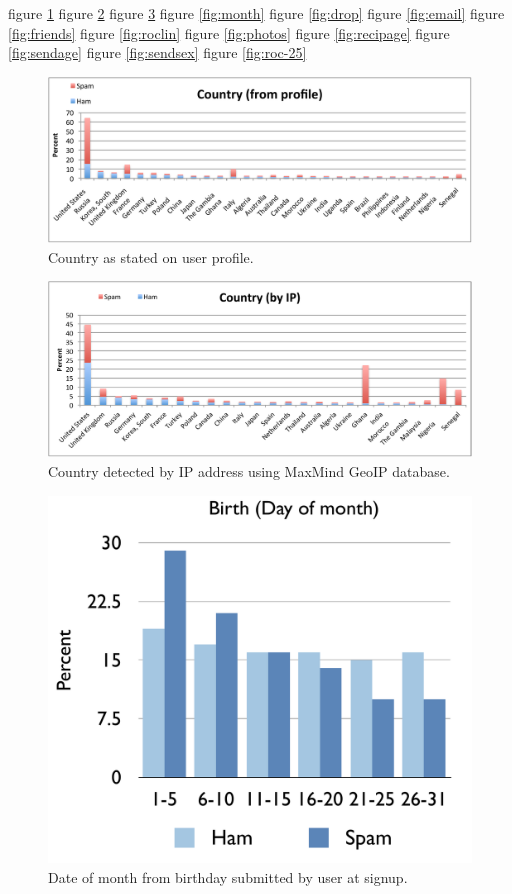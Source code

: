 \documentclass[preprint]{acm_proc_article-sp}
\begin{document}
figure \ref{fig:cprof}
figure \ref{fig:cip}
figure \ref{fig:day}
figure \ref{fig:month}
figure \ref{fig:drop}
figure \ref{fig:email}
figure \ref{fig:friends}
figure \ref{fig:roclin}
figure \ref{fig:photos}
figure \ref{fig:recipage}
figure \ref{fig:sendage}
figure \ref{fig:sendsex}
figure \ref{fig:roc-25}
\begin{figure}[h]
    \centering
    \includegraphics[width=\linewidth]{figures/country-prof.pdf}
    \caption{Country as stated on user profile.}
    \label{fig:cprof}
\end{figure}

\begin{figure}[h]
    \centering
    \includegraphics[width=\linewidth]{figures/country-ip.pdf}
    \caption{Country detected by IP address using MaxMind GeoIP database.}
    \label{fig:cip}
\end{figure}

\begin{figure}[h]
    \centering
    \includegraphics[width=\linewidth]{figures/dob-day.pdf}
    \caption{Date of month from birthday submitted by user at signup.}
    \label{fig:day}
\end{figure}
\end{document}
